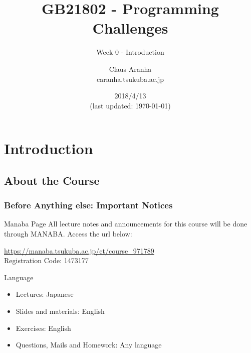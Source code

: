 \documentclass{beamer}
\title[GB21802]{GB21802 - Programming Challenges}
\subtitle[]{Week 0 - Introduction}
\author[Claus Aranha]{Claus Aranha\\{\footnotesize caranha\@@cs.tsukuba.ac.jp}}
\institute{Department of Computer Science}
\date{2018/4/13\\{\smaller(last updated: \today)}}
\begin{document}
\section{Introduction}
\subsection{About the Course}

\begin{frame}
\maketitle
\end{frame}


\begin{frame}
  \frametitle{Before Anything else: Important Notices}

  \begin{block}{Manaba Page}
    All lecture notes and announcements for this course will be done
    through MANABA. Access the url below:
    
    \medskip
    
    \url{https://manaba.tsukuba.ac.jp/ct/course_971789}\\
    Registration Code: 1473177
  \end{block}
  \begin{exampleblock}{Language}
    \begin{itemize}
      \item Lectures: Japanese
      \item Slides and materials: English
      \item Exercises: English
      \item Questions, Mails and Homework: Any language
    \end{itemize}
  \end{exampleblock}
\end{frame}
\end{document}
